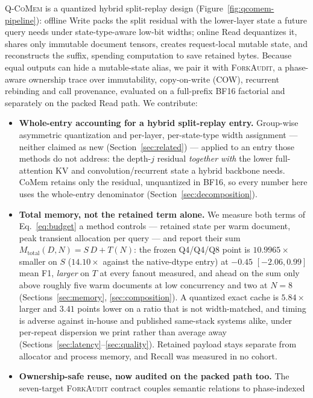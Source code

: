 \documentclass{article}
\newcommand{\qcomem}{\textsc{Q-CoMem}}
\newcommand{\method}{\textsc{ForkAudit}}
\begin{document}
\qcomem{} is a quantized hybrid split-replay design
(Figure~\ref{fig:qcomem-pipeline}): offline Write packs the split residual with
the lower-layer state a future query needs under state-type-aware low-bit
widths; online Read dequantizes it, shares only immutable document tensors,
creates request-local mutable state, and reconstructs the suffix, spending
computation to save retained bytes.  Because equal outputs can
hide a mutable-state alias, we
pair it with \method{}, a phase-aware ownership trace over immutability,
copy-on-write (COW), recurrent rebinding and call provenance, evaluated on a
full-prefix BF16 factorial and separately on the packed Read path.  We
contribute:
\begin{itemize}
  \setlength{\itemsep}{0pt}
  \setlength{\parskip}{0pt}
  \setlength{\topsep}{2pt}
  \setlength{\partopsep}{0pt}
  \item \textbf{Whole-entry accounting for a hybrid split-replay entry.}
Group-wise asymmetric quantization and per-layer, per-state-type width
assignment --- neither claimed as new (Section~\ref{sec:related}) --- applied to
an entry those methods do not address: the depth-$j$ residual \emph{together
with} the lower full-attention KV and convolution/recurrent state a hybrid
backbone needs.  CoMem retains only the residual, unquantized in BF16, so every
number here uses the whole-entry denominator (Section~\ref{sec:decomposition}).
  \item \textbf{Total memory, not the retained term alone.}  We measure both
terms of Eq.~\ref{eq:budget} a method controls --- retained state per warm
document, peak transient allocation per query --- and report their sum
$M_{\mathrm{total}}(D,N)=S\,D+T(N)$: the frozen Q4/Q4/Q8 point is
$10.9965\times$ smaller on $S$ ($14.10\times$ against the native-dtype entry) at
$-0.45$ $[-2.06,0.99]$ mean F1, \emph{larger} on $T$ at every fanout measured,
and ahead on the sum only above roughly five warm documents at low concurrency
and two at $N=8$ (Sections~\ref{sec:memory}, \ref{sec:composition}).  A
quantized exact cache is $5.84\times$ larger and $3.41$ points lower on a ratio
that is not width-matched, and timing is adverse against in-house and published
same-stack systems alike, under per-repeat dispersion we print rather than
average away (Sections~\ref{sec:latency}--\ref{sec:quality}).  Retained payload
stays separate from allocator and process memory, and Recall was measured in no
cohort.
  \item \textbf{Ownership-safe reuse, now audited on the packed path too.}  The
seven-target \method{} contract couples semantic relations to phase-indexed

\end{itemize}
\end{document}

